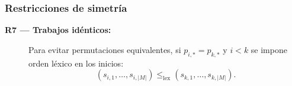 \subsubsection*{Restricciones de simetría}
\begin{description}
  \item[\textbf{R7 — Trabajos idénticos:}] Para evitar permutaciones equivalentes, si \(p_{i,*}=p_{k,*}\) y \(i<k\) se impone orden léxico en los inicios:
  \[
  (s_{i,1},\dots,s_{i,|M|}) \le_{\text{lex}} (s_{k,1},\dots,s_{k,|M|}).
  \]
\end{description}